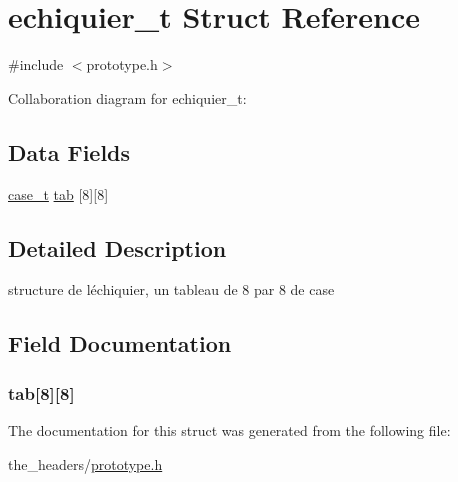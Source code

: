 \hypertarget{structechiquier__t}{}\section{echiquier\+\_\+t Struct Reference}
\label{structechiquier__t}


{\ttfamily \#include $<$prototype.\+h$>$}



Collaboration diagram for echiquier\+\_\+t\+:
\subsection*{Data Fields}
\begin{DoxyCompactItemize}
\item 
\hyperlink{structcase__t}{case\+\_\+t} \hyperlink{structechiquier__t_ab7bb655a846f73c02f3a4e8fceee7aa3}{tab} \mbox{[}8\mbox{]}\mbox{[}8\mbox{]}
\end{DoxyCompactItemize}


\subsection{Detailed Description}
structure de l\textquotesingle{}échiquier, un tableau de 8 par 8 de case 

\subsection{Field Documentation}
\subsubsection[{\texorpdfstring{tab}{tab}}]{ tab\mbox{[}8\mbox{]}\mbox{[}8\mbox{]}}\hypertarget{structechiquier__t_ab7bb655a846f73c02f3a4e8fceee7aa3}{}\label{structechiquier__t_ab7bb655a846f73c02f3a4e8fceee7aa3}


The documentation for this struct was generated from the following file\+:\begin{DoxyCompactItemize}
\item 
the\+\_\+headers/\hyperlink{prototype_8h}{prototype.\+h}\end{DoxyCompactItemize}
